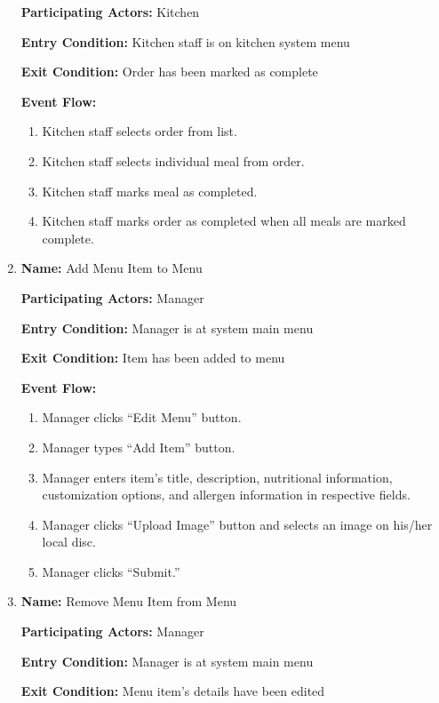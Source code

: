 \documentclass[11pt]{article}
\begin{document}
\begin{enumerate}
			\textbf{Participating Actors:} 	Kitchen

			\textbf{Entry Condition:} 		Kitchen staff is on kitchen system menu

			\textbf{Exit Condition:} 		Order has been marked as complete

			\textbf{Event Flow:}
			\begin{enumerate}
				\setlength{\leftskip}{1cm}
				\item Kitchen staff selects order from list.
				\item Kitchen staff selects individual meal from order.
				\item Kitchen staff marks meal as completed.
				\item Kitchen staff marks order as completed when all meals are marked complete.\\
			\end{enumerate}

		\newpage

		\item \textbf{Name:} 				Add Menu Item to Menu

			\textbf{Participating Actors:} 	Manager

			\textbf{Entry Condition:} 		Manager is at system main menu

			\textbf{Exit Condition:} 		Item has been added to menu

			\textbf{Event Flow:}
			\begin{enumerate}
				\setlength{\leftskip}{1cm}
				\item Manager clicks ``Edit Menu'' button.
				\item Manager types ``Add Item'' button.
				\item Manager enters item’s title, description, nutritional information, customization options, and allergen information in respective fields.
				\item Manager clicks ``Upload Image'' button and selects an image on his/her local disc.
				\item Manager clicks ``Submit.''\\
			\end{enumerate}

		\item \textbf{Name:} 				Remove Menu Item from Menu

			\textbf{Participating Actors:} 	Manager

			\textbf{Entry Condition:} 		Manager is at system main menu

			\textbf{Exit Condition:} 		Menu item's details have been edited


\end{enumerate}
\end{document}
